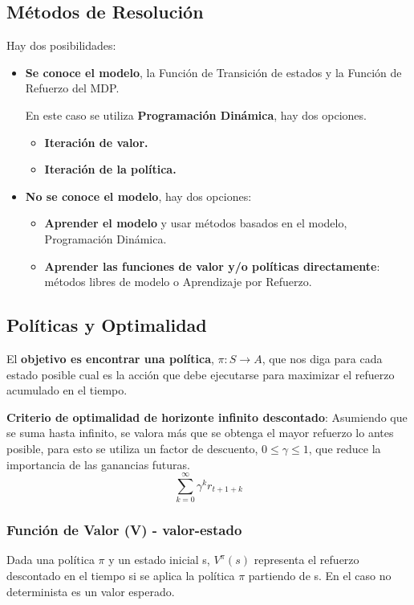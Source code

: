 \documentclass[12pt]{report} %
\begin{document}
\subsection{Métodos de Resolución}
Hay dos posibilidades:
\begin{itemize}
  \item \textbf{Se conoce el modelo}, la Función de Transición de estados y la Función de Refuerzo del MDP.
  
  En este caso se utiliza \textbf{Programación Dinámica}, hay dos opciones.
  \begin{itemize}
    \item \textbf{Iteración de valor.}
    \item \textbf{Iteración de la política.}
  \end{itemize}

  \item \textbf{No se conoce el modelo}, hay dos opciones:
  \begin{itemize}
    \item \textbf{Aprender el modelo} y usar métodos basados en el modelo, Programación Dinámica.
    \item \textbf{Aprender las funciones de valor y/o políticas directamente}: métodos libres de modelo o Aprendizaje por Refuerzo.
  \end{itemize}
\end{itemize}

\subsection{Políticas y Optimalidad}

El \textbf{objetivo es encontrar una política}, $\pi: S \rightarrow A$, que nos diga para cada estado posible cual es la acción que debe ejecutarse para maximizar el refuerzo acumulado en el tiempo.

\textbf{Criterio de optimalidad de horizonte infinito descontado}: Asumiendo que se suma hasta infinito, se valora más que se obtenga el mayor refuerzo lo antes posible, para esto se utiliza un factor de descuento, $0 \leq \gamma \leq 1$, que reduce la importancia de las ganancias futuras.
$$\sum ^\infty _{k=0} \gamma^k r_{t+1+k}$$

\pagebreak

\subsubsection{Función de Valor (V) - valor-estado}
Dada una política $\pi$ y un estado inicial s, $V^\pi (s)$ representa el refuerzo descontado en el tiempo si se aplica la política $\pi$ partiendo de s. En el caso no determinista es un valor esperado.
\end{document}
